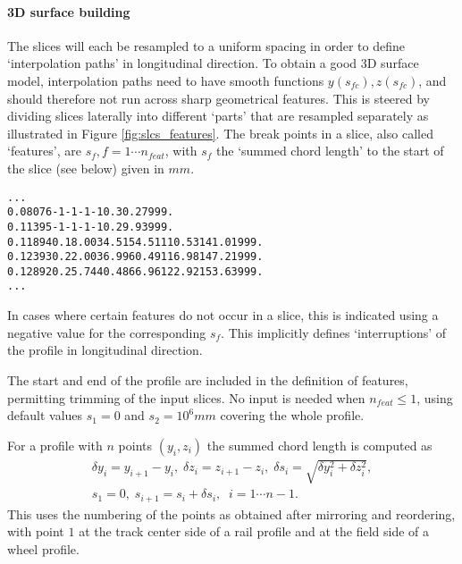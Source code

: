\documentclass[12pt]{report}
\begin{document}
\paragraph{3D surface building}

The slices will each be resampled to a uniform spacing in order to define
`interpolation paths' in longitudinal direction. To obtain a good 3D
surface model, interpolation paths need to have smooth functions $y(s_{fc}),
z(s_{fc})$, and should therefore not run across sharp geometrical features.
This is steered by dividing slices laterally into different `parts' that are
resampled separately as illustrated in Figure \ref{fig:slcs_features}. The
break points in a slice, also called `features', are $s_f, f=1\cdots
n_{feat}$, with $s_f$ the `summed chord length' to the start of the slice
(see below) given in $\unit{mm}$.

\begin{alltt}\small
%  - S_F positions at geometrical features at start/end of each part per slice
%  S_SLC    S_F [mm],  F = 1 .. NFEAT
          ...
 0.08076     -1      -1       -1       -1       0.      30.27   999.
 0.11395     -1      -1       -1       -1       0.      29.93   999.
 0.11894      0.    18.00    34.51    54.51   110.53   141.01   999.
 0.12393      0.    22.00    36.99    60.49   116.98   147.21   999.
 0.12892      0.    25.74    40.48    66.96   122.92   153.63   999.
          ...
\end{alltt}
In cases where certain features do not occur in a slice, this is indicated
using a negative value for the corresponding $s_f$. This implicitly defines
`interruptions' of the profile in longitudinal direction.

The start and end of the profile are included in the definition of features,
permitting trimming of the input slices. No input is needed when
$n_{feat}\le 1$, using default values $s_1=0$ and $s_2=10^6\unit{mm}$
covering the whole profile. 

For a profile with $n$ points $(y_i,z_i)$ the summed chord length is computed
as
\begin{eqnarray}
    \delta y_i = y_{i+1}-y_i, \;
    \delta z_i = z_{i+1}-z_i, \;
    \delta s_i = \sqrt{ \delta y_i^2 + \delta z_i^2 }, \nonumber \\
    s_1 = 0, \; s_{i+1} = s_i + \delta s_i , \;\;
                i = 1 \cdots n-1.
\end{eqnarray}
This uses the numbering of the points as obtained after mirroring and
reordering, with point $1$ at the track center side of a rail profile
and at the field side of a wheel profile.
\end{document}
